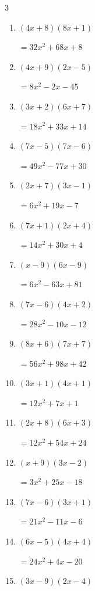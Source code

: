 \begin{multicols}{3}
\begin{enumerate}
        $=56x^{2}+33x-14$

\columnbreak %

\resetques

  \item $(4x+8)(8x+1)$

        $=32x^{2}+68x+8$

  \item $(4x+9)(2x-5)$

        $=8x^{2}-2x-45$

  \item $(3x+2)(6x+7)$

        $=18x^{2}+33x+14$

  \item $(7x-5)(7x-6)$

        $=49x^{2}-77x+30$

  \item $(2x+7)(3x-1)$

        $=6x^{2}+19x-7$

  \item $(7x+1)(2x+4)$

        $=14x^{2}+30x+4$

  \item $(x-9)(6x-9)$

        $=6x^{2}-63x+81$

  \item $(7x-6)(4x+2)$

        $=28x^{2}-10x-12$

  \item $(8x+6)(7x+7)$

        $=56x^{2}+98x+42$

  \item $(3x+1)(4x+1)$

        $=12x^{2}+7x+1$

  \item $(2x+8)(6x+3)$

        $=12x^{2}+54x+24$

  \item $(x+9)(3x-2)$

        $=3x^{2}+25x-18$

  \item $(7x-6)(3x+1)$

        $=21x^{2}-11x-6$

  \item $(6x-5)(4x+4)$

        $=24x^{2}+4x-20$

  \item $(3x-9)(2x-4)$


\end{enumerate}
\end{multicols}

